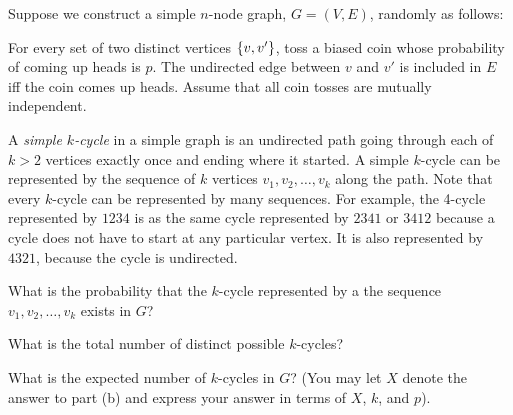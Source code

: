 \documentclass[11pt,twoside]{article}
\begin{document}
\begin{problem} Suppose we construct a simple $n$-node graph,
$G=(V,E)$, randomly as follows:

For every set of two distinct vertices $\left\{v,v'\right\}$, toss a biased
coin whose probability of coming up heads is $p$.  The undirected edge
between $v$ and $v'$ is included in $E$ iff the coin comes up heads.
Assume that all coin tosses are mutually independent.

A \emph{simple $k$-cycle} in a simple graph is an undirected path
going through each of $k>2$ vertices exactly once and ending where it
started.  A simple $k$-cycle can be represented by the sequence of $k$
vertices $v_1, v_2, \ldots, v_k$ along the path. Note that every
$k$-cycle can be represented by many sequences. For example, the
4-cycle represented by $1234$ is as the same cycle represented by
$2341$ or $3412$ because a cycle does not have to start at any
particular vertex.  It is also represented by $4321$, because the
cycle is undirected.

\begin{problemparts}
\problempart What is the probability that the $k$-cycle represented by
a the sequence $v_1, v_2, \dots, v_k$ exists in $G$?


\problempart What is the total number of distinct possible $k$-cycles?


\problempart What is the expected number of $k$-cycles in $G$?  (You
may let $X$ denote the answer to part (b) and express your answer in
terms of $X$, $k$, and $p$).


\end{problemparts}
\end{problem}
\end{document}
